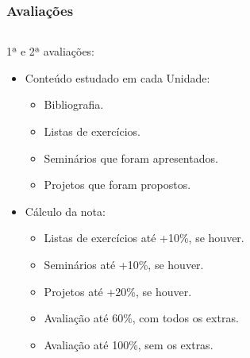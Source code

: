 \begin{frame}[t]\frametitle{Avaliações}

  \begin{columns}[onlytextwidth,T]

    \begin{column}{0.48\linewidth}
      \begin{block}{1ª e 2ª avaliações:}
        \begin{itemize}
            \justifying{}
            \item Conteúdo estudado em cada Unidade:
            \begin{itemize}
              \justifying{}
              \item Bibliografia.
              \item Listas de exercícios.
              \item Seminários que foram apresentados.
              \item Projetos que foram propostos.
            \end{itemize}
            \item Cálculo da nota:
            \begin{itemize}
              \justifying{}
              \item Listas de exercícios até +10\%, se houver.
              \item Seminários até +10\%, se houver.
              \item Projetos até +20\%, se houver.
              \item Avaliação até 60\%, com todos os extras.
              \item Avaliação até 100\%, sem os extras.
            \end{itemize}
        \end{itemize}
      \end{block}
    \end{column}


\end{columns}
\end{frame}
